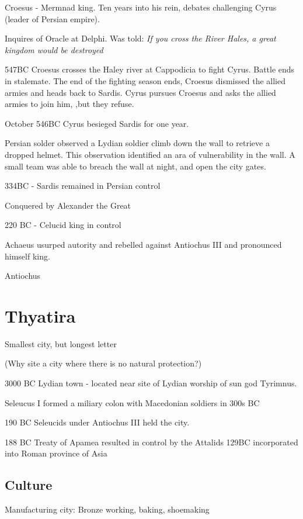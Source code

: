 \documentclass[
]{book}
\begin{document}
Croesus - Mermnad king. Ten years into his rein, debates challenging Cyrus (leader of Persian empire).

Inquires of Oracle at Delphi. Was told: \emph{If you cross the River Hales, a great kingdom would be destroyed}

547BC Croesus crosses the Haley river at Cappodicia to fight Cyrus. Battle ends in stalemate. The end of the fighting season ends, Croesus dismissed the allied armies and heads back to Sardis. Cyrus pursues Croesus and asks the allied armies to join him, ,but they refuse.

October 546BC Cyrus besieged Sardis for one year.

Persian solder observed a Lydian soldier climb down the wall to retrieve a dropped helmet. This observation identified an ara of vulnerability in the wall. A small team was able to breach the wall at night, and open the city gates.

334BC - Sardis remained in Persian control

Conquered by Alexander the Great

220 BC - Celucid king in control

Achaeus usurped autority and rebelled against Antiochus III and pronounced himself king.

Antiochus

\hypertarget{thyatira}{%
\chapter{Thyatira}\label{thyatira}}

Smallest city, but longest letter

(Why site a city where there is no natural protection?)

3000 BC Lydian town - located near site of Lydian worship of sun god Tyrimnus.

Seleucus I formed a miliary colon with Macedonian soldiers in 300s BC

190 BC Seleucids under Antiochus III held the city.

188 BC Treaty of Apamea resulted in control by the Attalids
129BC incorporated into Roman province of Asia

\hypertarget{culture-1}{%
\section{Culture}\label{culture-1}}

Manufacturing city: Bronze working, baking, shoemaking
\end{document}
